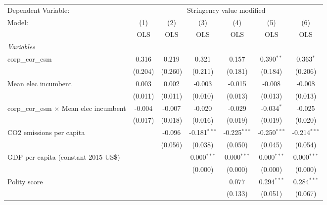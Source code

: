 
\begingroup
\centering
\begin{tabular}{lcccccc}
   \toprule
   Dependent Variable: & \multicolumn{6}{c}{Stringency value modified}\\
   Model:                                         & (1)     & (2)     & (3)            & (4)            & (5)            & (6)\\  
                                                  &  OLS    & OLS     & OLS            & OLS            & OLS            & OLS\\  
   \midrule
   \emph{Variables}\\
   corp\_cor\_esm                                 & 0.316   & 0.219   & 0.321          & 0.157          & 0.390$^{**}$   & 0.363$^{*}$\\   
                                                  & (0.204) & (0.260) & (0.211)        & (0.181)        & (0.184)        & (0.206)\\   
   Mean elec incumbent                            & 0.003   & 0.002   & -0.003         & -0.015         & -0.008         & -0.008\\   
                                                  & (0.011) & (0.011) & (0.010)        & (0.013)        & (0.013)        & (0.013)\\   
   corp\_cor\_esm $\times$ Mean elec incumbent    & -0.004  & -0.007  & -0.020         & -0.029         & -0.034$^{*}$   & -0.025\\   
                                                  & (0.017) & (0.018) & (0.016)        & (0.019)        & (0.019)        & (0.020)\\   
   CO2 emissions per capita                       &         & -0.096  & -0.181$^{***}$ & -0.225$^{***}$ & -0.250$^{***}$ & -0.214$^{***}$\\   
                                                  &         & (0.056) & (0.038)        & (0.050)        & (0.045)        & (0.054)\\   
   GDP per capita (constant 2015 US\$)            &         &         & 0.000$^{***}$  & 0.000$^{***}$  & 0.000$^{***}$  & 0.000$^{***}$\\   
                                                  &         &         & (0.000)        & (0.000)        & (0.000)        & (0.000)\\   
   Polity score                                   &         &         &                & 0.077          & 0.294$^{***}$  & 0.284$^{***}$\\   
                                                  &         &         &                & (0.133)        & (0.051)        & (0.067)\\   

\end{tabular}
